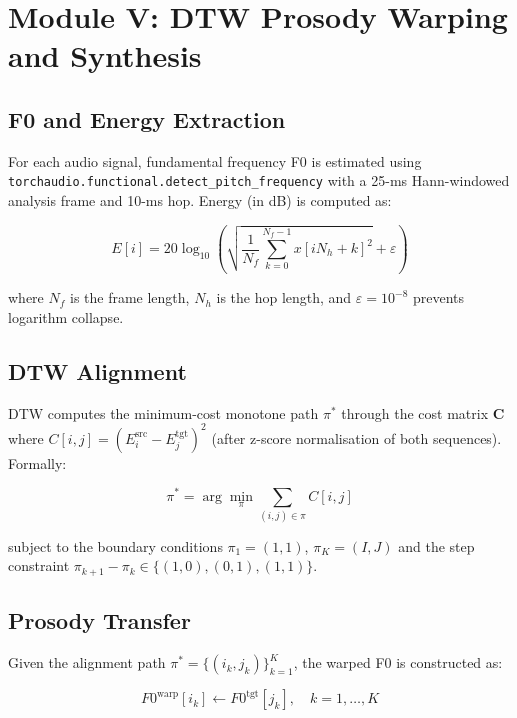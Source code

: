 \documentclass[10pt,twocolumn]{article}
\begin{document}
\section{Module V: DTW Prosody Warping and Synthesis}\label{sec:prosody}

\subsection{F0 and Energy Extraction}

For each audio signal, fundamental frequency F0 is estimated using \texttt{torchaudio.functional.detect\_pitch\_frequency} with a 25-ms Hann-windowed analysis frame and 10-ms hop. Energy (in dB) is computed as:

\begin{equation}
E[i] = 20 \log_{10}\!\left(\sqrt{\frac{1}{N_f}\sum_{k=0}^{N_f-1} x[iN_h + k]^2} + \varepsilon\right)
\label{eq:energy}
\end{equation}

where $N_f$ is the frame length, $N_h$ is the hop length, and $\varepsilon = 10^{-8}$ prevents logarithm collapse.

\subsection{DTW Alignment}

DTW computes the minimum-cost monotone path $\pi^*$ through the cost matrix $\mathbf{C}$ where $C[i,j] = (E^{\text{src}}_i - E^{\text{tgt}}_j)^2$ (after z-score normalisation of both sequences). Formally:

\begin{equation}
\pi^* = \arg\min_{\pi} \sum_{(i,j)\in\pi} C[i,j]
\label{eq:dtw}
\end{equation}

subject to the boundary conditions $\pi_1 = (1,1)$, $\pi_K = (I,J)$ and the step constraint $\pi_{k+1} - \pi_k \in \{(1,0),(0,1),(1,1)\}$.

\subsection{Prosody Transfer}

Given the alignment path $\pi^* = \{(i_k, j_k)\}_{k=1}^K$, the warped F0 is constructed as:

\begin{equation}
F0^{\text{warp}}[i_k] \leftarrow F0^{\text{tgt}}[j_k], \quad k = 1, \ldots, K
\label{eq:f0_warp}
\end{equation}
\end{document}
